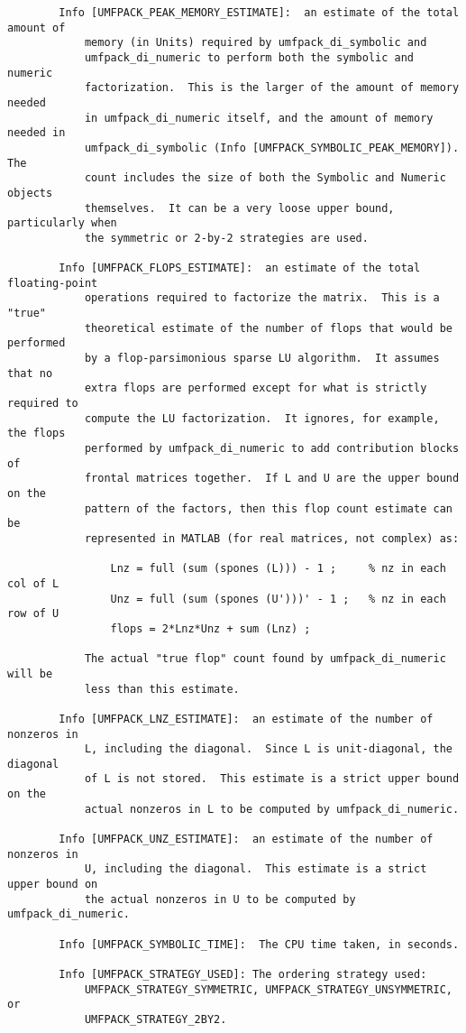 \documentclass[11pt]{article}
\begin{document}
{\begin{verbatim}
        Info [UMFPACK_PEAK_MEMORY_ESTIMATE]:  an estimate of the total amount of
            memory (in Units) required by umfpack_di_symbolic and
            umfpack_di_numeric to perform both the symbolic and numeric
            factorization.  This is the larger of the amount of memory needed
            in umfpack_di_numeric itself, and the amount of memory needed in
            umfpack_di_symbolic (Info [UMFPACK_SYMBOLIC_PEAK_MEMORY]).  The
            count includes the size of both the Symbolic and Numeric objects
            themselves.  It can be a very loose upper bound, particularly when
            the symmetric or 2-by-2 strategies are used.

        Info [UMFPACK_FLOPS_ESTIMATE]:  an estimate of the total floating-point
            operations required to factorize the matrix.  This is a "true"
            theoretical estimate of the number of flops that would be performed
            by a flop-parsimonious sparse LU algorithm.  It assumes that no
            extra flops are performed except for what is strictly required to
            compute the LU factorization.  It ignores, for example, the flops
            performed by umfpack_di_numeric to add contribution blocks of
            frontal matrices together.  If L and U are the upper bound on the
            pattern of the factors, then this flop count estimate can be
            represented in MATLAB (for real matrices, not complex) as:

                Lnz = full (sum (spones (L))) - 1 ;     % nz in each col of L
                Unz = full (sum (spones (U')))' - 1 ;   % nz in each row of U
                flops = 2*Lnz*Unz + sum (Lnz) ;

            The actual "true flop" count found by umfpack_di_numeric will be
            less than this estimate.

        Info [UMFPACK_LNZ_ESTIMATE]:  an estimate of the number of nonzeros in
            L, including the diagonal.  Since L is unit-diagonal, the diagonal
            of L is not stored.  This estimate is a strict upper bound on the
            actual nonzeros in L to be computed by umfpack_di_numeric.

        Info [UMFPACK_UNZ_ESTIMATE]:  an estimate of the number of nonzeros in
            U, including the diagonal.  This estimate is a strict upper bound on
            the actual nonzeros in U to be computed by umfpack_di_numeric.

        Info [UMFPACK_SYMBOLIC_TIME]:  The CPU time taken, in seconds.

        Info [UMFPACK_STRATEGY_USED]: The ordering strategy used:
            UMFPACK_STRATEGY_SYMMETRIC, UMFPACK_STRATEGY_UNSYMMETRIC, or
            UMFPACK_STRATEGY_2BY2.
\end{verbatim}
}
\end{document}
